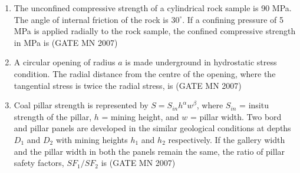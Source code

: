 \documentclass[journal]{IEEEtran}
\begin{document}
\begin{enumerate}
\item The unconfined compressive strength of a cylindrical rock sample is 90 MPa. The angle of internal friction of the rock is $30^\circ$. If a confining pressure of 5 MPa is applied radially to the rock sample, the confined compressive strength in MPa is
	\hfill (GATE MN 2007)
\begin{enumerate}
\end{enumerate}



\item A circular opening of radius $a$ is made underground in hydrostatic stress condition. The radial distance from the centre of the opening, where the tangential stress is twice the radial stress, is
\hfill (GATE MN 2007)
\begin{enumerate}
\end{enumerate}



\item Coal pillar strength is represented by $S = S_{in} h^\alpha w^\beta$, where $S_{in}$ = insitu strength of the pillar, $h$ = mining height, and $w$ = pillar width. Two bord and pillar panels are developed in the similar geological conditions at depths $D_1$ and $D_2$ with mining heights $h_1$ and $h_2$ respectively. If the gallery width and the pillar width in both the panels remain the same, the ratio of pillar safety factors, $SF_1/SF_2$ is
\hfill (GATE MN 2007)
\begin{enumerate}
\end{enumerate}




\end{enumerate}
\end{document}
